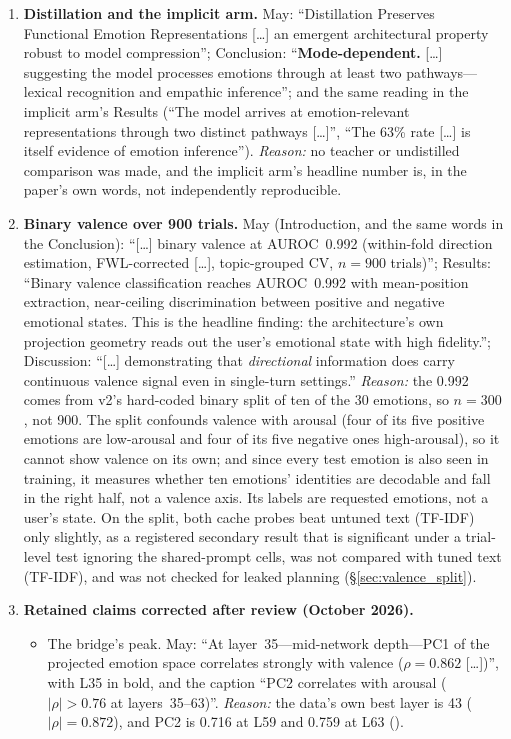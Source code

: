 \documentclass[11pt,a4paper]{article}
\begin{document}
\begin{enumerate}[leftmargin=*]
    \item \label{app:item:implicit}\textbf{Distillation and the implicit arm.} May: ``Distillation Preserves Functional Emotion Representations [\ldots] an emergent architectural property robust to model compression''; Conclusion: ``\textbf{Mode-dependent.} [\ldots] suggesting the model processes emotions through at least two pathways---lexical recognition and empathic inference''; and the same reading in the implicit arm's Results (``The model arrives at emotion-relevant representations through two distinct pathways [\ldots]'', ``The 63\% rate [\ldots] is itself evidence of emotion inference''). \emph{Reason:} no teacher or undistilled comparison was made, and the implicit arm's headline number is, in the paper's own words, not independently reproducible.
    \item \label{app:item:binary}\textbf{Binary valence over 900 trials.} May (Introduction, and the same words in the Conclusion): ``[\ldots] binary valence at AUROC~0.992 (within-fold direction estimation, FWL-corrected [\ldots], topic-grouped CV, $n = 900$ trials)''; Results: ``Binary valence classification reaches AUROC~0.992 with mean-position extraction, near-ceiling discrimination between positive and negative emotional states. This is the headline finding: the architecture's own projection geometry reads out the user's emotional state with high fidelity.''; Discussion: ``[\ldots] demonstrating that \emph{directional} information does carry continuous valence signal even in single-turn settings.'' \emph{Reason:} the 0.992 comes from v2's hard-coded binary split of ten of the 30 emotions, so $n = 300$, not 900. The split confounds valence with arousal (four of its five positive emotions are low-arousal and four of its five negative ones high-arousal), so it cannot show valence on its own; and since every test emotion is also seen in training, it measures whether ten emotions' identities are decodable and fall in the right half, not a valence axis. Its labels are requested emotions, not a user's state. On the split, both cache probes beat untuned text (TF-IDF) only slightly, as a registered secondary result that is significant under a trial-level test ignoring the shared-prompt cells, was not compared with tuned text (TF-IDF), and was not checked for leaked planning (\S\ref{sec:valence_split}).
    \item \label{app:item:retained}\textbf{Retained claims corrected after review (October 2026).}
    \begin{itemize}[nosep]
        \item The bridge's peak. May: ``At layer~35---mid-network depth---PC1 of the projected emotion space correlates strongly with valence ($\rho = 0.862$ [\ldots])'', with L35 in bold, and the caption ``PC2 correlates with arousal ($|\rho| > 0.76$ at layers~35--63)''. \emph{Reason:} the data's own best layer is 43 ($|\rho| = 0.872$), and PC2 is 0.716 at L59 and 0.759 at L63 ().

\end{itemize}
\end{enumerate}
\end{document}
